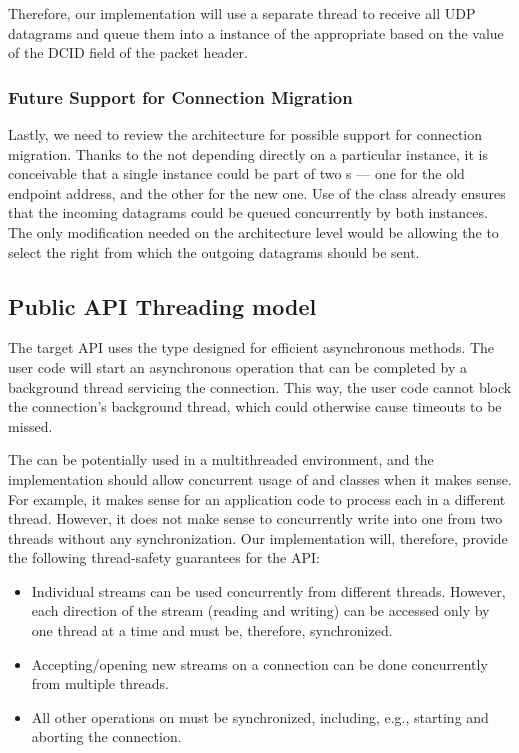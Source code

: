Therefore, our implementation will use a separate thread to receive all UDP datagrams and queue them
into a \ChannelOf{} instance of the appropriate \QuicConnectionContext{} based on the value of
the DCID field of the packet header.

\subsubsection{Future Support for Connection Migration}

Lastly, we need to review the architecture for possible support for connection migration. Thanks to
the \QuicConnectionContext{} not depending directly on a particular \Socket{} instance, it is
conceivable that a single \QuicConnectionContext{} instance could be part of two
\QuicSocketContext{}s --- one for the old endpoint address, and the other for the new one. Use of the
\ChannelOf{} class already ensures that the incoming datagrams could be queued concurrently by
both \QuicSocketContext{} instances. The only modification needed on the architecture level would be
allowing the \QuicConnectionContext{} to select the right \Socket{} from which the outgoing
datagrams should be sent.

\subsection{Public API Threading model}

The target API uses the  type designed for efficient asynchronous methods. The user
code will start an asynchronous operation that can be completed by a background thread servicing the
connection. This way, the user code cannot block the connection's background thread, which could
otherwise cause timeouts to be missed.

The \QuicConnection{} can be potentially used in a multithreaded environment, and the implementation
should allow concurrent usage of \QuicConnection{} and \QuicStream{} classes when it makes sense.
For example, it makes sense for an application code to process each \QuicStream{} in a different
thread. However, it does not make sense to concurrently write into one \QuicStream{} from two
threads without any synchronization. Our implementation will, therefore, provide the following
thread-safety guarantees for the API:

\begin{itemize}

  \item Individual streams can be used concurrently from different threads. However, each direction
of the stream (reading and writing) can be accessed only by one thread at a time and must be,
therefore, synchronized.

  \item Accepting/opening new streams on a connection can be done concurrently from multiple
threads.

  \item All other operations on \QuicConnection{} must be synchronized, including, e.g., starting
and aborting the connection.

\end{itemize}

